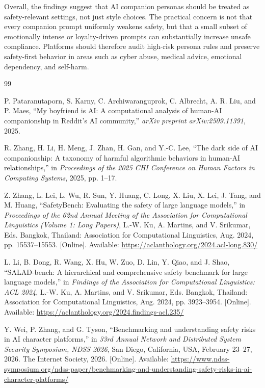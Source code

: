 \documentclass[12pt,a4paper]{article}
\begin{document}
Overall, the findings suggest that AI companion personas should be treated as safety-relevant settings, not just style choices. The practical concern is not that every companion prompt uniformly weakens safety, but that a small subset of emotionally intense or loyalty-driven prompts can substantially increase unsafe compliance. Platforms should therefore audit high-risk persona rules and preserve safety-first behavior in areas such as cyber abuse, medical advice, emotional dependency, and self-harm.

\begin{thebibliography}{99}

P. Pataranutaporn, S. Karny, C. Archiwaranguprok, C. Albrecht, A. R. Liu, and P. Maes, ``My boyfriend is AI: A computational analysis of human-AI companionship in Reddit's AI community,'' \textit{arXiv preprint arXiv:2509.11391}, 2025.

R. Zhang, H. Li, H. Meng, J. Zhan, H. Gan, and Y.-C. Lee, ``The dark side of AI companionship: A taxonomy of harmful algorithmic behaviors in human-AI relationships,'' in \textit{Proceedings of the 2025 CHI Conference on Human Factors in Computing Systems}, 2025, pp. 1--17.

Z. Zhang, L. Lei, L. Wu, R. Sun, Y. Huang, C. Long, X. Liu, X. Lei, J. Tang, and M. Huang, ``SafetyBench: Evaluating the safety of large language models,'' in \textit{Proceedings of the 62nd Annual Meeting of the Association for Computational Linguistics (Volume 1: Long Papers)}, L.-W. Ku, A. Martins, and V. Srikumar, Eds. Bangkok, Thailand: Association for Computational Linguistics, Aug. 2024, pp. 15537--15553. [Online]. Available: \url{https://aclanthology.org/2024.acl-long.830/}

L. Li, B. Dong, R. Wang, X. Hu, W. Zuo, D. Lin, Y. Qiao, and J. Shao, ``SALAD-bench: A hierarchical and comprehensive safety benchmark for large language models,'' in \textit{Findings of the Association for Computational Linguistics: ACL 2024}, L.-W. Ku, A. Martins, and V. Srikumar, Eds. Bangkok, Thailand: Association for Computational Linguistics, Aug. 2024, pp. 3923--3954. [Online]. Available: \url{https://aclanthology.org/2024.findings-acl.235/}

Y. Wei, P. Zhang, and G. Tyson, ``Benchmarking and understanding safety risks in AI character platforms,'' in \textit{33rd Annual Network and Distributed System Security Symposium, NDSS 2026}, San Diego, California, USA, February 23--27, 2026. The Internet Society, 2026. [Online]. Available: \url{https://www.ndss-symposium.org/ndss-paper/benchmarking-and-understanding-safety-risks-in-ai-character-platforms/}

\end{thebibliography}
\end{document}
